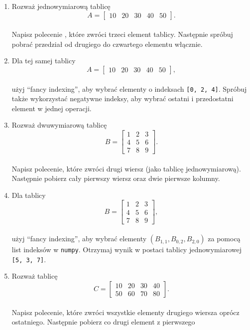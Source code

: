 \documentclass[
  polish,
  letterpaper,
  DIV=11,
  numbers=noendperiod]{scrreprt}
\begin{document}
\begin{enumerate}
\def\labelenumi{\arabic{enumi}.}
\item
  Rozważ jednowymiarową tablicę\\
  \[A = \begin{bmatrix}10 & 20 & 30 & 40 & 50\end{bmatrix}.\]\\
  Napisz polecenie , które zwróci trzeci element tablicy. Następnie
  spróbuj pobrać przedział od drugiego do czwartego elementu włącznie.
\item
  Dla tej samej tablicy\\
  \[A = \begin{bmatrix}10 & 20 & 30 & 40 & 50\end{bmatrix},\]\\
  użyj ``fancy indexing'', aby wybrać elementy o indeksach
  \texttt{{[}0,\ 2,\ 4{]}}. Spróbuj także wykorzystać negatywne indeksy,
  aby wybrać ostatni i przedostatni element w jednej operacji.
\item
  Rozważ dwuwymiarową tablicę\\
  \[B = \begin{bmatrix}1 & 2 & 3 \\ 4 & 5 & 6 \\ 7 & 8 & 9\end{bmatrix}.\]\\
  Napisz polecenie, które zwróci drugi wiersz (jako tablicę
  jednowymiarową). Następnie pobierz cały pierwszy wiersz oraz dwie
  pierwsze kolumny.
\item
  Dla tablicy\\
  \[B = \begin{bmatrix}1 & 2 & 3 \\ 4 & 5 & 6 \\ 7 & 8 & 9\end{bmatrix},\]\\
  użyj ``fancy indexing'', aby wybrać elementy
  \((B_{1,1}, B_{0,2}, B_{2,0})\) za pomocą list indeksów w
  \texttt{numpy}. Otrzymaj wynik w postaci tablicy jednowymiarowej
  \texttt{{[}5,\ 3,\ 7{]}}.
\item
  Rozważ tablicę\\
  \[C = \begin{bmatrix}10 & 20 & 30 & 40 \\ 50 & 60 & 70 & 80\end{bmatrix}.\]\\
  Napisz polecenie, które zwróci wszystkie elementy drugiego wiersza
  oprócz ostatniego. Następnie pobierz co drugi element z pierwszego

\end{enumerate}
\end{document}
